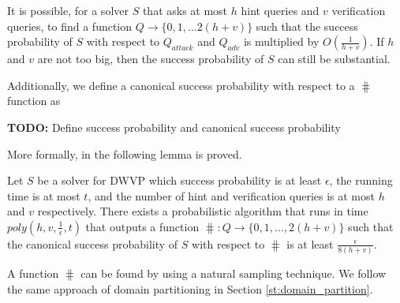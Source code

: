 It is possible, for a solver $S$ that asks at most $h$ hint queries and $v$ verification queries,
to find a function $Q \rightarrow \{0,1,\dotsc 2(h+v)\}$ such that the success probability of $S$ with respect to
$Q_{\mathit{attack}}$ and $Q_{\mathit{adv}}$ is multiplied by $O(\frac{1}{h+v})$.
If $h$ and $v$ are not too big, then the success probability of $S$ can still be substantial.

Additionally, we define a canonical success probability with respect to a $\hash$ function as
\begin{todo}
  \textbf{TODO:} Define success probability and canonical success probability
\end{todo}

More formally, in \cite{Dodis:2009:SAI:1530441.1530450} the following lemma is proved.
\begin{lemma}
Let $S$ be a solver for DWVP which success probability is at least $\epsilon$, the running time is at most $t$,
and the number of hint and verification queries is at most $h$ and $v$ respectively.
There exists a probabilistic algorithm that runs in time $poly(h,v,\frac{1}{\epsilon},t)$
that outputs a function $\hash : Q \rightarrow \{0,1, \dotsc, 2(h+v)\}$ such that the canonical
success probability of $S$ with respect to $\hash$ is at least $\frac{\epsilon}{8(h+v)}$.
\end{lemma}
A function $\hash$ can be found by using a natural sampling technique.
We follow the same approach of domain partitioning in Section \ref{st:domain_partition}.

